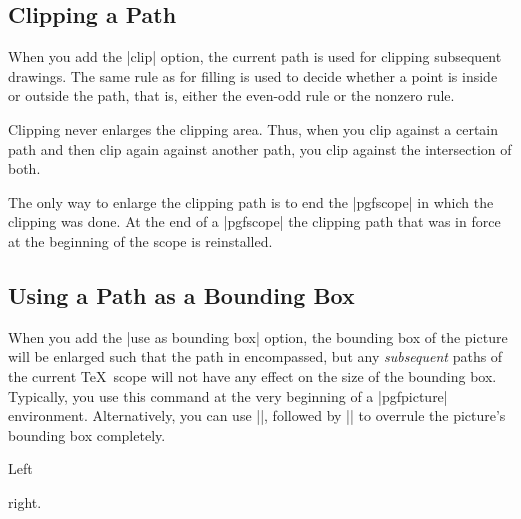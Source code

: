 \subsection{Clipping a Path}
\label{section-clip}

When you add the |clip| option, the current path is used for clipping
subsequent drawings. The same rule as for filling is used to decide whether a
point is inside or outside the path, that is, either the even-odd rule or the
nonzero rule.

Clipping never enlarges the clipping area. Thus, when you clip against a
certain path and then clip again against another path, you clip against the
intersection of both.

The only way to enlarge the clipping path is to end the |{pgfscope}| in which
the clipping was done. At the end of a |{pgfscope}| the clipping path that was
in force at the beginning of the scope is reinstalled.


\subsection{Using a Path as a Bounding Box}
\label{section-using-bb}

When you add the |use as bounding box| option, the bounding box of the picture
will be enlarged such that the path in encompassed, but any \emph{subsequent}
paths of the current \TeX\ scope will not have any effect on the size of the
bounding box. Typically, you use this command at the very beginning of a
|{pgfpicture}| environment. Alternatively, you can use |\pgfresetboundingbox|,
followed by || to overrule the picture's
bounding box completely.
%
\begin{codeexample}[]
Left
\begin{pgfpicture}
  \pgfpathrectangle{\pgfpointorigin}{\pgfpoint{2ex}{1ex}}

  \pgfpathcircle{\pgfpointorigin}{2ex}
\end{pgfpicture}
right.
\end{codeexample}
